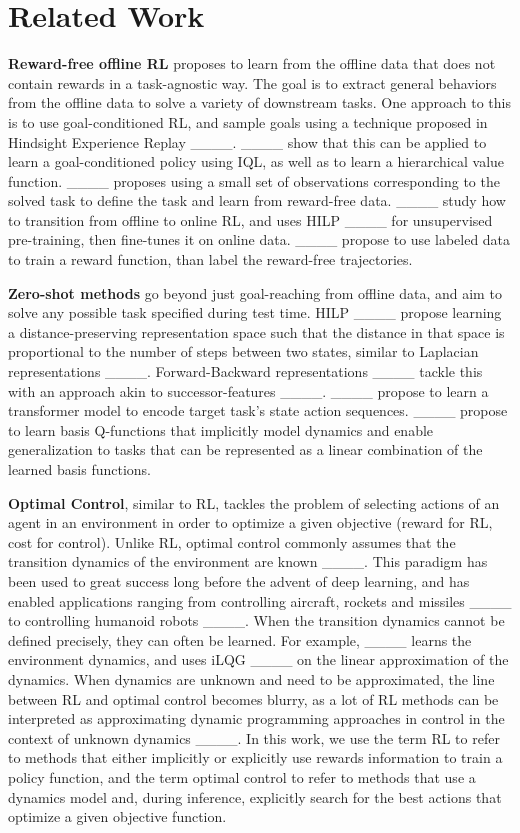 \section{Related Work}
\textbf{Reward-free offline RL} proposes to learn from the offline data that does not contain rewards in a task-agnostic way.
The goal is to extract general behaviors from the offline data to solve a variety of downstream tasks. 
One approach to this is to use goal-conditioned RL, and sample goals using a technique proposed in Hindsight Experience Replay ____. ____ show that this can be applied to learn a goal-conditioned
policy using IQL, as well as to learn a hierarchical value function. ____ proposes using a small
set of observations corresponding to the solved task to define the task and learn from reward-free data. ____ study how to transition from offline to online RL, and uses HILP ____ for unsupervised pre-training, then fine-tunes it on online data. ____ propose to use labeled data to train a reward function, than label the reward-free trajectories.

\textbf{Zero-shot methods} go beyond just goal-reaching from offline data, and aim to solve any possible task specified during test time. 
HILP ____ propose learning a distance-preserving representation space such that the distance in that space is proportional to the number of steps between two states, similar to Laplacian representations ____. Forward-Backward representations ____ tackle this with an approach akin to successor-features ____.  ____ propose to learn a transformer model to encode target task's state action sequences. ____ propose to learn basis Q-functions that implicitly model dynamics and enable generalization to tasks that can be represented as a linear combination of the learned basis functions.

\textbf{Optimal Control}, similar to RL, tackles the problem of selecting actions 
of an agent in an environment in order to optimize a given objective (reward for RL, cost for control). Unlike RL, optimal control commonly assumes that the transition dynamics of the environment are known ____. This paradigm has been used to great success long before the advent of deep learning, and has enabled applications ranging from controlling aircraft, rockets and missiles ____ to controlling humanoid robots ____. When the transition dynamics cannot be defined precisely, they can often be learned. For example, ____ learns the environment dynamics, and uses iLQG ____ on the linear approximation of the dynamics.
When dynamics are unknown and need to be approximated, 
the line between RL and optimal control becomes blurry, as a lot of RL methods can be interpreted as approximating dynamic programming approaches in control in the context of unknown dynamics ____.  
In this work, we use the term RL to refer to methods that either implicitly or explicitly use rewards information to train a policy function, and the term optimal control to refer to methods that use a dynamics model and, during inference, explicitly search for the best actions that optimize a given objective function. 

